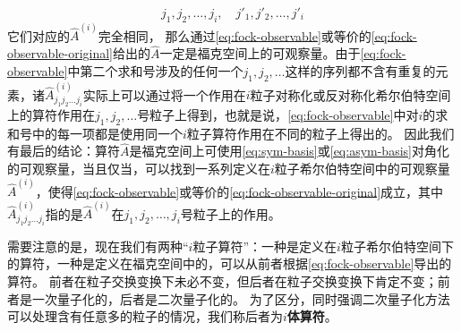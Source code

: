 \documentclass[UTF8, a4paper]{ctexart}
\begin{document}
\[
    j_1, j_2, \ldots, j_i, \quad j'_1, j'_2, \ldots, j'_i
\]
它们对应的$\hat{A}^{(i)}$完全相同，
那么通过\eqref{eq:fock-observable}或等价的\eqref{eq:fock-observable-original}给出的$\hat{A}$一定是福克空间上的可观察量。由于\eqref{eq:fock-observable}中第二个求和号涉及的任何一个$j_1, j_2, \ldots$这样的序列都不含有重复的元素，诸$\hat{A}^{(i)}_{j_1 j_2 \ldots j_i}$实际上可以通过将一个作用在$i$粒子对称化或反对称化希尔伯特空间上的算符作用在$j_1, j_2, \ldots$号粒子上得到，也就是说，\eqref{eq:fock-observable}中对$i$的求和号中的每一项都是使用同一个$i$粒子算符作用在不同的粒子上得出的。
因此我们有最后的结论：算符$\hat{A}$是福克空间上可使用\eqref{eq:sym-basis}或\eqref{eq:asym-basis}对角化的可观察量，当且仅当，可以找到一系列定义在$i$粒子希尔伯特空间中的可观察量$\hat{A}^{(i)}$，使得\eqref{eq:fock-observable}或等价的\eqref{eq:fock-observable-original}成立，其中$\hat{A}^{(i)}_{j_1 j_2 \ldots j_i}$指的是$\hat{A}^{(i)}$在$j_1, j_2, \ldots, j_i$号粒子上的作用。

需要注意的是，现在我们有两种“$i$粒子算符”：一种是定义在$i$粒子希尔伯特空间下的算符，一种是定义在福克空间中的，可以从前者根据\eqref{eq:fock-observable}导出的算符。
前者在粒子交换变换下未必不变，但后者在粒子交换变换下肯定不变；前者是一次量子化的，后者是二次量子化的。
为了区分，同时强调二次量子化方法可以处理含有任意多的粒子的情况，我们称后者为\textbf{$i$体算符}。
\end{document}
